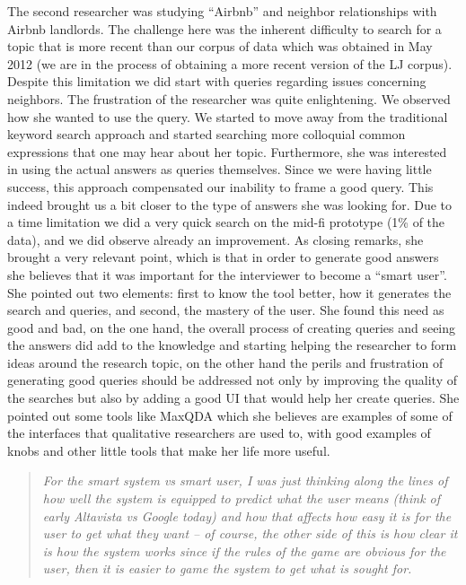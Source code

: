 \documentclass{sigchi}
\begin{document}
The second researcher was studying ``Airbnb'' and neighbor relationships with Airbnb landlords. The challenge here was the inherent difficulty to search for a topic that is more recent than our corpus of data which was obtained in May 2012 (we are in the process of obtaining a more recent version of the LJ corpus). Despite this limitation we did start with queries regarding issues concerning neighbors. The frustration of the researcher was quite enlightening. We observed how she wanted to use the query. We started to move away from the traditional keyword search approach and started searching more colloquial common expressions that one may hear about her topic. Furthermore, she was interested in using the actual answers as queries themselves. Since we were having little success, this approach compensated our inability to frame a good query. This indeed brought us a bit closer to the type of answers she was looking for. Due to a time limitation we did a very quick search on the mid-fi prototype (1\% of the data), and we did observe already an improvement. As closing remarks, she brought a very relevant point, which is that in order to generate good answers she believes that it was important for the interviewer to become a ``smart user''. She pointed out two elements: first to know the tool better, how it generates the search and queries, and second, the mastery of the user. She found this need as good and bad, on the one hand, the overall process of creating queries and seeing the answers did add to the knowledge and starting helping the researcher to form ideas around the research topic, on the other hand the perils and frustration of generating good queries should be addressed not only by improving the quality of the searches but also by adding a good UI that would help her create queries. She pointed out some tools like MaxQDA \cite{maxqda:2007} which she believes are examples of some of the interfaces that qualitative researchers are used to, with good examples of knobs and other little tools that make her life more useful. 

\begin{quote}
{\em
For the smart system vs smart user, I was just thinking along the lines of how well the system is equipped to predict what the user means (think of early Altavista vs Google today) and how that affects how easy it is for the user to get what they want -- of course, the other side of this is how clear it is how the system works since if the rules of the game are obvious for the user, then it is easier to game the system to get what is sought for.
}\end{quote}
\end{document}
